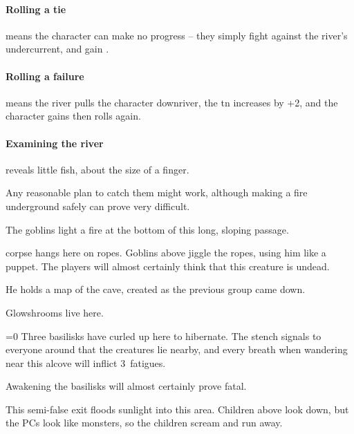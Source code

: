 \begin{multicols}{2}
\paragraph{Rolling a tie}
means the character can make no progress -- they simply fight against the river's undercurrent, and gain .

\paragraph{Rolling a failure}
means the river pulls the character downriver, the \gls{tn} increases by +2, and the character gains  then rolls again.

\paragraph{Examining the river}
reveals little fish, about the size of a finger.

Any reasonable plan to catch them might work, although making a fire underground safely can prove very difficult.%


The goblins light a fire at the bottom of this long, sloping passage.


 corpse hangs here on ropes.
Goblins above jiggle the ropes, using him like a puppet.
The players will almost certainly think that this creature is undead.

He holds a map of the cave, created as the previous group came down.


Glowshrooms live here.


\ifnum\value{temperature}=0
  Three basilisks have curled up here to hibernate.
  The stench signals to everyone around that the creatures lie nearby, and every breath when wandering near this alcove will inflict 3~\glspl{fatigue}.

  Awakening the basilisks will almost certainly prove fatal.

\else
\fi


This semi-false exit floods sunlight into this area.
Children above look down, but the PCs look like monsters, so the children scream and run away.




\end{multicols}
